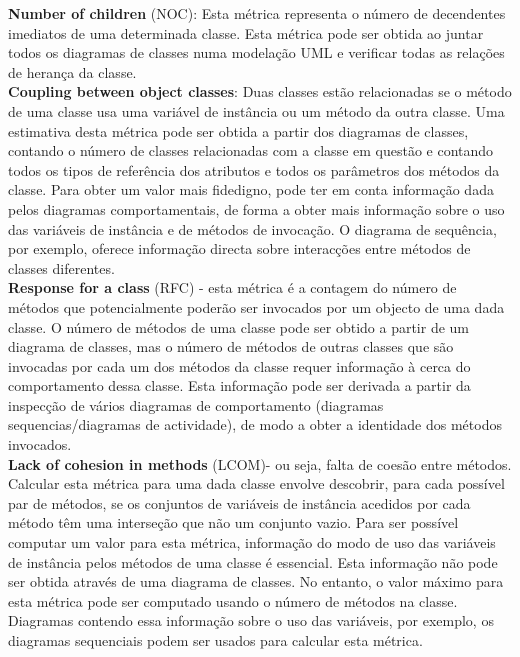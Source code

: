 \textbf{Number of children} (NOC): Esta métrica representa o número de decendentes imediatos de uma determinada classe. Esta métrica pode ser obtida ao juntar todos os diagramas de classes numa modelação UML e verificar todas as relações de herança da classe.\\

\textbf{Coupling between object classes}: Duas classes estão relacionadas se o método de uma classe usa uma variável de instância ou um método da outra classe. Uma estimativa desta métrica pode ser obtida a partir dos diagramas de classes, contando o número de classes relacionadas com a classe em questão e contando todos os tipos de referência dos atributos e todos os parâmetros dos métodos da classe. Para obter um valor mais fidedigno, pode ter em conta informação dada pelos diagramas comportamentais, de forma a obter mais informação sobre o uso das variáveis de instância e de métodos de invocação. O diagrama de sequência, por exemplo, oferece informação directa sobre interacções entre métodos de classes diferentes. \\

\textbf{Response for a class} (RFC) - esta métrica é a contagem do número de métodos que potencialmente poderão ser invocados por um objecto de uma dada classe. O número de métodos de uma classe pode ser obtido a partir de um diagrama de classes, mas o número de métodos de outras classes que são invocadas por cada um dos métodos da classe requer informação à cerca do comportamento dessa classe. Esta informação pode ser derivada a partir da inspecção de vários diagramas de comportamento (diagramas sequencias/diagramas de actividade), de modo a obter a identidade dos métodos invocados.\\


\textbf{Lack of cohesion in methods} (LCOM)- ou seja, falta de coesão entre métodos. Calcular esta métrica para uma dada classe envolve descobrir, para cada possível par de métodos, se os conjuntos de variáveis de instância acedidos por cada método têm uma interseção que não um conjunto vazio.
Para ser possível computar um valor para esta métrica, informação do modo de uso das variáveis de instância pelos métodos de uma classe é essencial. Esta informação não pode ser obtida através de uma diagrama de classes. No entanto, o valor máximo para esta métrica pode ser computado usando o número de métodos na classe. Diagramas contendo essa informação sobre o uso das variáveis, por exemplo, os diagramas sequenciais podem ser usados para calcular esta métrica.\\
